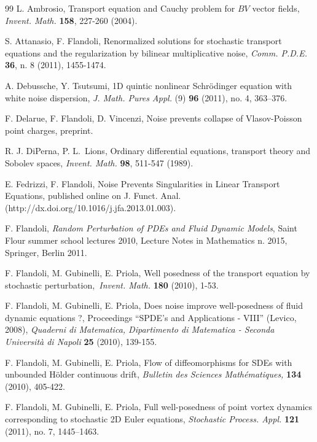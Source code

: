 \documentclass{article}
\begin{document}
\footnotesize
\begin{thebibliography}{99}                                                                                               %
L. Ambrosio, Transport equation and Cauchy problem for $BV$
vector fields, \textit{Invent. Math.} \textbf{158}, 227-260 (2004).

S. Attanasio, F. Flandoli, Renormalized solutions for stochastic
transport equations and the regularization by bilinear multiplicative noise,
\textit{Comm. P.D.E. }\textbf{36}, n. 8 (2011), 1455-1474.

A. Debussche, Y. Tsutsumi, 1D quintic nonlinear Schr\"{o}dinger
equation with white noise dispersion, \textit{J. Math. Pures Appl.} (9)
\textbf{96} (2011), no. 4, 363--376.

F. Delarue, F. Flandoli, D. Vincenzi, Noise prevents collapse of
Vlasov-Poisson point charges, preprint.

R. J. DiPerna, P. L.\ Lions, Ordinary differential
equations, transport theory and Sobolev spaces, \textit{Invent. Math.}
\textbf{98}, 511-547 (1989).

E. Fedrizzi, F. Flandoli, Noise Prevents Singularities in
Linear Transport Equations, published online on  J. Funct. Anal. (http://dx.doi.org/10.1016/j.jfa.2013.01.003).

F. Flandoli, \textit{Random Perturbation of PDEs and Fluid
Dynamic Models}, Saint Flour summer school lectures 2010, Lecture Notes in
Mathematics n. 2015, Springer, Berlin 2011.

F. Flandoli, M. Gubinelli, E. Priola, Well posedness of the
transport equation by stochastic perturbation,\textit{\ Invent. Math.}
\textbf{180} (2010), 1-53.

F. Flandoli, M. Gubinelli, E. Priola, Does noise improve
well-posedness of fluid dynamic equations ?,
 Proceedings ``SPDE's and
 Applications - VIII'' (Levico, 2008),
   \textit{Quaderni di Matematica,
  Dipartimento di Matematica -
  Seconda Universit\`a di Napoli} \textbf{ 25} (2010),  139-155.


 F. Flandoli, M. Gubinelli, E. Priola, Flow of
 diffeomorphisms for SDEs with unbounded H\"older continuous drift,
  \textit{ Bulletin des Sciences Math\'ematiques,}
 \textbf{134} (2010),  405-422.

F. Flandoli, M. Gubinelli, E. Priola, Full well-posedness
of point vortex dynamics corresponding to stochastic 2D Euler equations,
\textit{Stochastic Process. Appl.} \textbf{121} (2011), no. 7, 1445--1463.


\end{thebibliography}
\end{document}

